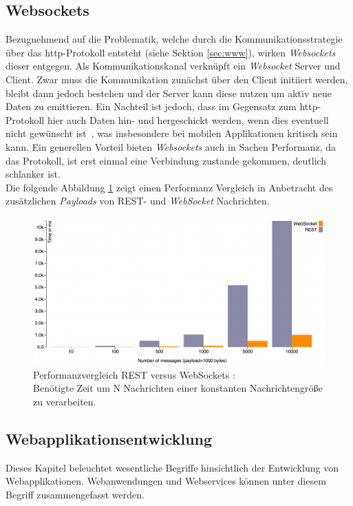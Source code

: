 \subsection{Websockets}\label{sec:websockets}
Bezugnehmend auf die Problematik, welche durch die Kommunikationsstrategie über das http-Protokoll entsteht (siehe Sektion \ref{sec:www}), wirken \emph{Websockets} dieser entgegen. Als Kommunikationskanal verknüpft ein \emph{Websocket} Server und Client. Zwar muss die Kommunikation zunächst über den Client initiiert werden, bleibt dann jedoch bestehen und der Server kann diese nutzen um aktiv neue Daten zu emittieren. Ein Nachteil ist jedoch, dass im Gegensatz zum http-Protokoll hier auch Daten hin- und hergeschickt werden, wenn dies eventuell nicht gewünscht ist~\cite{neumann2015entwicklung}, was insbesondere bei mobilen Applikationen kritisch sein kann. Ein generellen Vorteil bieten \emph{Websockets} auch in Sachen Performanz, da das Protokoll, ist erst einmal eine Verbindung zustande gekommen, deutlich schlanker ist. \\ Die folgende Abbildung \ref{fig:socketsrest} zeigt einen Performanz Vergleich in Anbetracht des zusätzlichen \emph{Payloads} von REST- und \emph{WebSocket} Nachrichten. 

\begin{figure}[H]
	\centering
	\includegraphics[width=0.9\linewidth]{bilder/websocket-rest-messages}
	\caption[Performanzvergleich REST versus WebSockets]{Performanzvergleich REST versus WebSockets \cite{Gupta2014}: \\ Benötigte Zeit um N Nachrichten einer konstanten Nachrichtengröße zu verarbeiten.}
	\label{fig:socketsrest}
\end{figure}

\subsection{Webapplikationsentwicklung}\label{sec:softwareentwicklung}
Dieses Kapitel beleuchtet wesentliche Begriffe hinsichtlich der Entwicklung von Webapplikationen.
Webanwendungen und Webservices können unter diesem Begriff zusammengefasst werden.
\\ 
